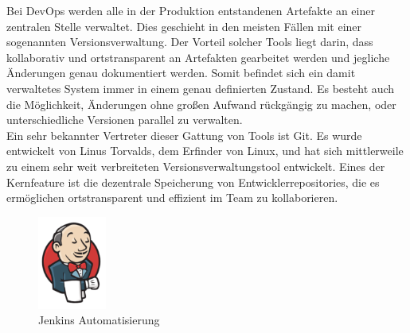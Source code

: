 Bei DevOps werden alle in der Produktion entstandenen Artefakte an einer zentralen Stelle verwaltet. Dies geschieht in den meisten Fällen mit einer sogenannten Versionsverwaltung. Der Vorteil solcher Tools liegt darin, dass kollaborativ und ortstransparent an Artefakten gearbeitet werden und jegliche Änderungen genau dokumentiert werden. Somit befindet sich ein damit verwaltetes System immer in einem genau definierten Zustand. Es besteht auch die Möglichkeit, Änderungen ohne großen Aufwand rückgängig zu machen, oder unterschiedliche Versionen parallel zu verwalten.\\
Ein sehr bekannter Vertreter dieser Gattung von Tools ist Git. Es wurde entwickelt von Linus Torvalds, dem Erfinder von Linux, und hat sich mittlerweile zu einem sehr weit verbreiteten Versionsverwaltungstool entwickelt. Eines der Kernfeature ist die dezentrale Speicherung von Entwicklerrepositories, die es ermöglichen ortstransparent und effizient im Team zu kollaborieren. \parencite[Vgl.][S. 31 ff.]{loeliger:2012}

\begin{figure}[ht]
  \centering
  \includegraphics[width=0.2\textwidth]{img/jenkins_logo.png}
  \caption{Jenkins Automatisierung \parencite[][]{Jenkins:2016}}
  \label{fig:scrummodell}
\end{figure}

